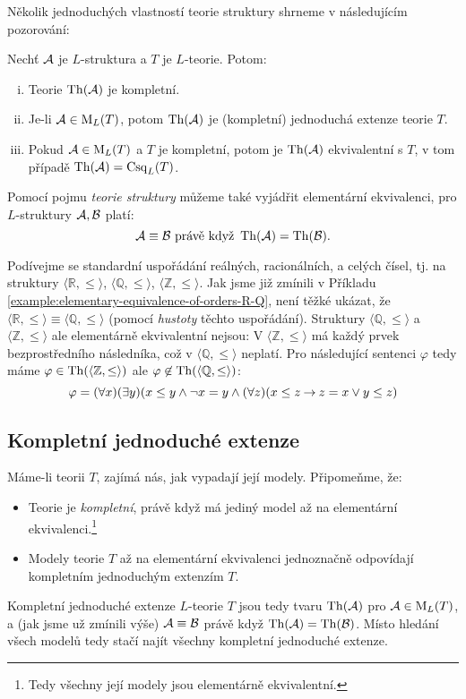 Několik jednoduchých vlastností teorie struktury shrneme v následujícím pozorování:

\begin{observation}
    Nechť $\mathcal{A}$ je $L$-struktura a $T$ je $L$-teorie. Potom:
    \begin{enumerate}[(i)]
        \item Teorie $\operatorname{Th}(\mathcal{A})$ je kompletní.
        \item Je-li $\mathcal{A}\in\operatorname{M}_L(T)$, potom $\operatorname{Th}(\mathcal{A})$ je (kompletní) jednoduchá extenze teorie $T$.
        \item Pokud $\mathcal{A}\in\operatorname{M}_L(T)$ a $T$ je kompletní, potom je $\operatorname{Th}(\mathcal{A})$ ekvivalentní s $T$, v tom případě $\operatorname{Th}(\mathcal{A})=\operatorname{Csq}_L(T)$.
    \end{enumerate}    
\end{observation}

Pomocí pojmu \emph{teorie struktury} můžeme také vyjádřit elementární ekvivalenci, pro $L$-struktury $\mathcal{A},\mathcal{B}$ platí:
$$
\mathcal{A}\equiv\mathcal{B} \text{ právě když }\operatorname{Th}(\mathcal{A})=\operatorname{Th}(\mathcal{B}).
$$

\begin{example}
   Podívejme se standardní uspořádání reálných, racionálních, a celých čísel, tj. na struktury $\langle\mathbb R,\leq\rangle$, $\langle\mathbb Q,\leq\rangle$, $\langle\mathbb Z,\leq\rangle$. Jak jsme již zmínili v Příkladu \ref{example:elementary-equivalence-of-orders-R-Q}, není těžké ukázat, že $\langle\mathbb R,\leq\rangle\equiv\langle\mathbb Q,\leq\rangle$ (pomocí \emph{hustoty} těchto uspořádání). Struktury $\langle\mathbb Q,\leq\rangle$ a $\langle\mathbb Z,\leq\rangle$ ale elementárně ekvivalentní nejsou: V $\langle\mathbb Z,\leq\rangle$ má každý prvek bezprostředního následníka, což v $\langle\mathbb Q,\leq\rangle$ neplatí. Pro následující sentenci $\varphi$ tedy máme $\varphi\in\operatorname{Th}(\langle\mathbb Z,\leq\rangle)$ ale $\varphi\not\in\operatorname{Th}(\langle\mathbb Q,\leq\rangle)$:
   $$
   \varphi=(\forall x)(\exists y)(x\leq y\land \neg x=y\land(\forall z)(x\leq z\mathbin{\rightarrow} z=x\lor y\leq z)
   $$
\end{example}


\subsection{Kompletní jednoduché extenze}

Máme-li teorii $T$, zajímá nás, jak vypadají její modely. Připomeňme, že:
\begin{itemize}
    \item Teorie je \emph{kompletní}, právě když má jediný model až na elementární ekvivalenci.\footnote{Tedy všechny její modely jsou elementárně ekvivalentní.}
    \item Modely teorie $T$ až na elementární ekvivalenci jednoznačně odpovídají kompletním jednoduchým extenzím $T$.
\end{itemize}
Kompletní jednoduché extenze $L$-teorie $T$ jsou tedy tvaru $\operatorname{Th}(\mathcal{A})$ pro $\mathcal{A}\in\operatorname{M}_L(T)$, a (jak jsme už zmínili výše) $\mathcal{A}\equiv\mathcal{B}$ právě když $\operatorname{Th}(\mathcal{A})=\operatorname{Th}(\mathcal{B})$. Místo hledání všech modelů tedy stačí najít všechny kompletní jednoduché extenze.

